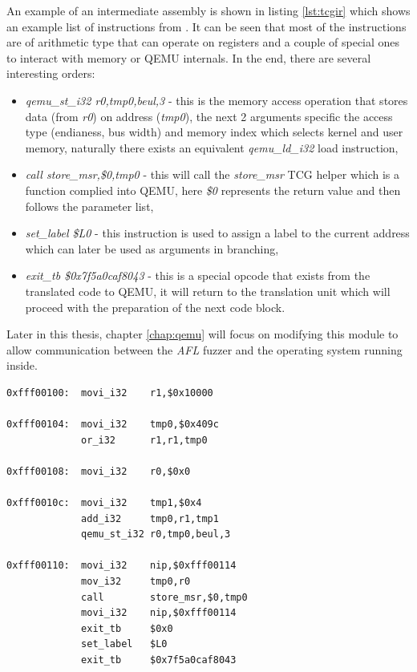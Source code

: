 An example of an intermediate assembly is shown in listing \ref{lst:tcgir} which shows an example list of instructions from \cite{qemutcgir}. It can be seen that most of the instructions are of arithmetic type that can operate on registers and a couple of special ones to interact with memory or QEMU internals. In the end, there are several interesting orders:
\begin{itemize}
    \item \textit{qemu\_st\_i32 r0,tmp0,beul,3} - this is the memory access operation that stores data (from \textit{r0}) on address (\textit{tmp0}), the next 2 arguments specific the access type (endianess, bus width) and memory index which selects kernel and user memory, naturally there exists an equivalent \textit{qemu\_ld\_i32} load instruction,
    \item \textit{call        store\_msr,\$0,tmp0} - this will call the \textit{store\_msr} TCG helper which is a function complied into QEMU, here \textit{\$0} represents the return value and then follows the parameter list,
    \item \textit{set\_label   \$L0} - this instruction is used to assign a label to the current address which can later be used as arguments in branching,
    \item \textit{exit\_tb     \$0x7f5a0caf8043} - this is a special opcode that exists from the translated code to QEMU, it will return to the translation unit which will proceed with the preparation of the next code block.
\end{itemize}
Later in this thesis, chapter \ref{chap:qemu} will focus on modifying this module to allow communication between the \textit{AFL} fuzzer and the operating system running inside.

\begin{minipage}{\linewidth}
\begin{lstlisting}[caption={QEMU TCG intermediate assembly code.},label={lst:tcgir}]
0xfff00100:  movi_i32    r1,$0x10000

0xfff00104:  movi_i32    tmp0,$0x409c
             or_i32      r1,r1,tmp0

0xfff00108:  movi_i32    r0,$0x0

0xfff0010c:  movi_i32    tmp1,$0x4
             add_i32     tmp0,r1,tmp1
             qemu_st_i32 r0,tmp0,beul,3

0xfff00110:  movi_i32    nip,$0xfff00114
             mov_i32     tmp0,r0
             call        store_msr,$0,tmp0
             movi_i32    nip,$0xfff00114
             exit_tb     $0x0
             set_label   $L0
             exit_tb     $0x7f5a0caf8043
\end{lstlisting}
\end{minipage}

